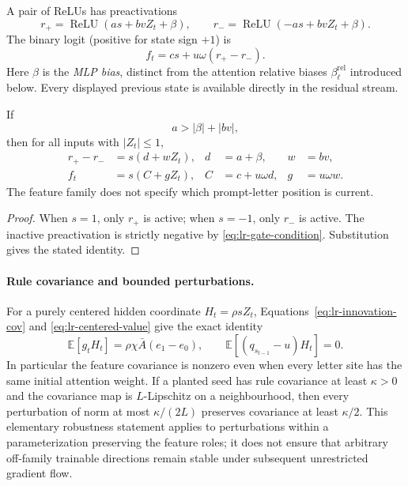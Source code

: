 A pair of ReLUs has preactivations
\begin{equation}\label{eq:lr-gates}
 r_+=\operatorname{ReLU}(as+bvZ_t+\beta),\qquad
 r_-=\operatorname{ReLU}(-as+bvZ_t+\beta).
\end{equation}
The binary logit (positive for state sign $+1$) is
\begin{equation}\label{eq:lr-factor-logit}
 f_t=cs+u\omega(r_+-r_-).
\end{equation}
Here $\beta$ is the \emph{MLP bias}, distinct from the attention
relative biases $\beta_\ell^{\mathrm{rel}}$ introduced below.
Every displayed previous state is available directly in the residual stream.

\begin{lrlemma}
\label{lem:lr-two-relu}
If
\begin{equation}\label{eq:lr-gate-condition}
 a>|\beta|+|bv|,
\end{equation}
then for all inputs with $|Z_t|\le1$,
\begin{equation}\label{eq:lr-feature-param}
 \begin{aligned}
 r_+-r_-&=s(d+wZ_t),& d&=a+\beta,& w&=bv,\\
 f_t&=s(C+gZ_t),& C&=c+u\omega d,& g&=u\omega w.
 \end{aligned}
\end{equation}
The feature family does not specify which prompt-letter position is current.
\end{lrlemma}
\begin{proof}
When $s=1$, only $r_+$ is active; when $s=-1$, only $r_-$ is active.
The inactive preactivation is strictly negative by
\eqref{eq:lr-gate-condition}.  Substitution gives the stated identity.
\end{proof}

\paragraph{Rule covariance and bounded perturbations.}
For a purely centered hidden coordinate $H_t=\rho sZ_t$,
Equations~\eqref{eq:lr-innovation-cov} and
\eqref{eq:lr-centered-value} give the exact identity
\begin{equation}\label{eq:lr-centered-seed-cov}
 \mathbb E[g_tH_t]=\rho\chi\bar A(e_1-e_0),\qquad
 \mathbb E[(q_{s_{t-1}}-u)H_t]=0.
\end{equation}
In particular the feature covariance is nonzero even when every
letter site has the same initial attention weight.  If a planted seed
has rule covariance at least $\kappa>0$ and the covariance map is
$L$-Lipschitz on a neighbourhood, then every perturbation of norm at
most $\kappa/(2L)$ preserves covariance at least $\kappa/2$.
This elementary robustness statement applies to perturbations within
a parameterization preserving the feature roles; it does not ensure
that arbitrary off-family trainable directions remain stable under
subsequent unrestricted gradient flow.

